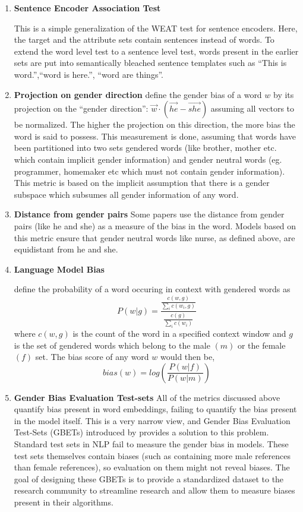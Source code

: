 \documentclass[11pt,a4paper]{article}
\begin{document}
\begin{enumerate}
    \item \textbf{Sentence Encoder Association Test}
    
    This is a simple generalization of the WEAT test for sentence encoders. Here, the target and the attribute sets contain sentences instead of words. To extend the word level test to a sentence level test, words present in the earlier sets are put into semantically bleached sentence templates such as ``This is word.'',``word is here.'', ``word are things''. \cite{may-etal-2019-measuring}
    
    \item \textbf{Projection on gender direction}
    \citet{NIPS2016_6228} define the gender bias of a word $w$ by its projection on the ``gender direction'': $\vec{w} \cdot (\vec{he} - \vec{she})$ assuming all vectors to be normalized. The higher the projection on this direction, the more bias the word is said to possess. This measurement is done, assuming that words have been partitioned into two sets gendered words (like brother, mother etc. which contain implicit gender information) and gender neutral words (eg. programmer, homemaker etc which must not contain gender information). This metric is based on the implicit assumption that there is a gender subspace which subsumes all gender information of any word.
    
    \item \textbf{Distance from gender pairs}
    Some papers use the distance from gender pairs (like he and she) as a measure of the bias in the word. Models based on this metric ensure that gender neutral words like nurse, as defined above, are equidistant from he and she.
    
    \item \textbf{Language Model Bias}
    
    \citet{bordia-bowman-2019-identifying} define the probability of a word occuring in context with gendered words as 
    \[P(w|g) = \frac{\frac{c(w,g)}{\sum_{i}c(w_i,g)}}{\frac{c(g)}{\sum_i c(w_i)}}\]
    where $c(w,g)$ is the count of the word in a specified context window and $g$ is the set of gendered words which belong to the male $(m)$ or the female $(f)$ set. The bias score of any word $w$ would then be,
    \[bias(w) = log(\frac{P(w|f)}{P(w|m)})\]
    
    \item \textbf{Gender Bias Evaluation Test-sets}
    All of the metrics discussed above quantify bias present in word embeddings, failing to quantify the bias present in the model itself. This is a very narrow view, and Gender Bias Evaluation Test-Sets (GBETs) introduced by \citet{sun-etal-2019-mitigating} provides a solution to this problem. Standard test sets in NLP fail to measure the gender bias in models. These test sets themselves contain biases (such as containing more male references than female references), so evaluation on them might not reveal biases. The goal of designing these GBETs is to provide a standardized dataset to the research community to streamline research and allow them to measure biases present in their algorithms.
    

\end{enumerate}
\end{document}
